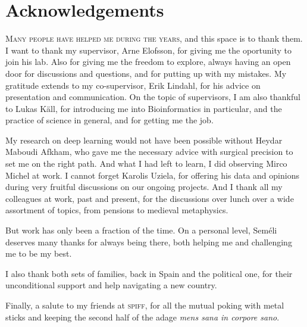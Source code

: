 \chapter*{Acknowledgements}

\lettrine[lines=3, lhang=0.15, nindent=0em]{\color{Maroon}M}{any people have helped me during the years,}
and this space is to thank them.
I want to thank my supervisor, Arne Elofsson, for giving me the oportunity to join his lab.
Also for giving me the freedom to explore, always having an open door for discussions and questions, and for putting up with my mistakes.
My gratitude extends to my co-supervisor, Erik Lindahl, for his advice on presentation and communication.
On the topic of supervisors, I am also thankful to Lukas Käll, for introducing me into Bioinformatics in particular, and the practice of science in general, and for getting me the job.

\begin{center}
    \vspace{9pt}
    \adfleafleft
    \vspace{9pt}
\end{center}

My research on deep learning would not have been possible without Heydar Maboudi Afkham, who gave me the necessary advice with surgical precision to set me on the right path.
And what I had left to learn, I did observing Mirco Michel at work.
I cannot forget Karolis Uziela, for offering his data and opinions during very fruitful discussions on our ongoing projects.
And I thank all my colleagues at work, past and present, for the discussions over lunch over a wide assortment of topics, from pensions to medieval metaphysics. 

\begin{center}
    \vspace{9pt}
    \adfflowerleft
    \vspace{9pt}
\end{center}

But work has only been a fraction of the time.
On a personal level, Seméli deserves many thanks for always being there, both helping me and challenging me to be my best.

I also thank both sets of families, back in Spain and the political one, for their unconditional support and help navigating a new country.

\begin{center}
    \vspace{9pt}
    \adfdownleafright
    \vspace{9pt}
\end{center}

Finally, a salute to my friends at \textsc{spiff}, for all the mutual poking with metal sticks and keeping the second half of the adage \emph{mens sana in corpore sano}.

